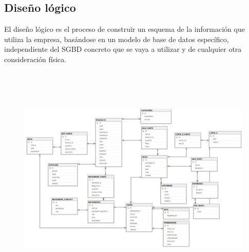 \documentclass[a4paper,DIV=12]{scrreprt}
\begin{document}
\subsection{Diseño lógico}
El diseño lógico es el proceso de construir un esquema de la información que utiliza la empresa, basándose en un modelo de base de datos específico, independiente del SGBD concreto que se vaya a utilizar y de cualquier otra consideración física.\\
\begin{figure}[!htb]
    \centering
	\includegraphics[height=11cm]{Dislogico.jpeg}
\end{figure}
\newpage
\end{document}

